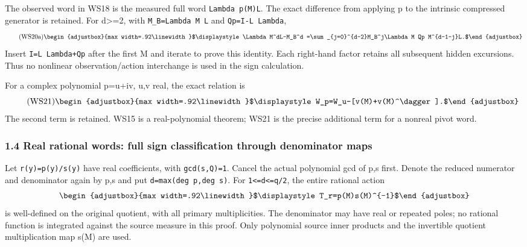 \documentclass[11pt]{article}
\begin{document}
The observed word in WS18 is the measured full word \texttt{Lambda p(M)L}. The exact difference from applying p to the intrinsic compressed generator is retained. For d\textgreater=2, with \texttt{M\_\allowbreak{}B=\allowbreak{}Lambda M L} and \texttt{Qp=\allowbreak{}I-L Lambda}, 
\begin{equation*}
\tag{WS20a}
\begin{adjustbox}{max width=.92\linewidth}$\displaystyle \Lambda M^dL-M_B^d
 =\sum_{j=0}^{d-2}M_B^j\Lambda M Qp M^{d-1-j}L.$\end{adjustbox}
\end{equation*}
 Insert \texttt{I=\allowbreak{}L Lambda+Qp} after the first M and iterate to prove this identity. Each right-hand factor retains all subsequent hidden excursions. Thus no nonlinear observation/action interchange is used in the sign calculation.

For a complex polynomial p=u+iv, u,v real, the exact relation is 
\begin{equation*}
\tag{WS21}
\begin{adjustbox}{max width=.92\linewidth}$\displaystyle W_p=W_u-[v(M)+v(M)^\dagger].$\end{adjustbox}
\end{equation*}
 The second term is retained. WS15 is a real-polynomial theorem; WS21 is the precise additional term for a nonreal pivot word.

\subsubsection{1.4 Real rational words: full sign classification through denominator maps}\label{part3-real-rational-words-full-sign-classification-through-denominator-maps}

Let \texttt{r(y)=\allowbreak{}p(y)/\allowbreak{}s(y)} have real coefficients, with \texttt{gcd(s,\allowbreak{}Q)=\allowbreak{}1}. Cancel the actual polynomial gcd of p,s first. Denote the reduced numerator and denominator again by p,s and put \texttt{d=\allowbreak{}max(deg p,\allowbreak{}deg s)}. For \texttt{1\textless{}=\allowbreak{}d\textless{}=\allowbreak{}q/\allowbreak{}2}, the entire rational action 
\begin{equation*}
\begin{adjustbox}{max width=.92\linewidth}$\displaystyle T_r=p(M)s(M)^{-1}$\end{adjustbox}
\end{equation*}
 is well-defined on the original quotient, with all primary multiplicities. The denominator may have real or repeated poles; no rational function is integrated against the source measure in this proof. Only polynomial source inner products and the invertible quotient multiplication map s(M) are used.
\end{document}
